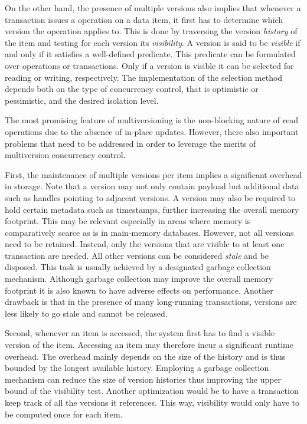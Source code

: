 On the other hand, the presence of multiple versions also implies that whenever
a transaction issues a operation on a data item, it first has to determine which
version the operation applies to. This is done by traversing the version
\emph{history} of the item and testing for each version its \emph{visibility}. A
version is said to be \emph{visible} if and only if it satisfies a well-defined
predicate. This predicate can be formulated over operations or transactions.
Only if a version is visible it can be selected for reading or writing,
respectively. The implementation of the selection method depends both on the
type of concurrency control, that is optimistic or pessimistic, and the desired
isolation level.

The most promising feature of multiversioning is the non-blocking nature of read
operations due to the absence of in-place updates. However, there also important
problems that need to be addressed in order to leverage the merits of
multiversion concurrency control.

First, the maintenance of multiple versions per item implies a significant
overhead in storage. Note that a version may not only contain payload but
additional data such as handles pointing to adjacent versions. A version may
also be required to hold certain metadata such as timestamps, further increasing
the overall memory footprint. This may be relevant especially in areas where
memory is comparatively scarce as is in main-memory databases. However, not all
versions need to be retained. Instead, only the versions that are visible to at
least one transaction are needed. All other versions can be considered
\emph{stale} and be disposed. This task is usually achieved by a designated
garbage collection mechanism. Although garbage collection may improve the
overall memory footprint it is also known to have adverse effects on
performance. Another drawback is that in the presence of many long-running
transactions, versions are less likely to go stale and cannot be released.

Second, whenever an item is accessed, the system first has to find a visible
version of the item. Accessing an item may therefore incur a significant runtime
overhead. The overhead mainly depends on the size of the history and is thus
bounded by the longest available history. Employing a garbage collection
mechanism can reduce the size of version histories thus improving the upper
bound of the visibility test. Another optimization would be to have a
transaction keep track of all the versions it references. This way, visibility
would only have to be computed once for each item.

